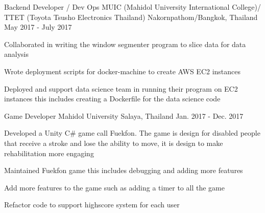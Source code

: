 \begin{cventries}
    \cventry
      {Backend Developer / Dev Ops} %
      {MUIC (Mahidol University International College)/ TTET (Toyota Tsusho Electronics Thailand)} %
      {Nakornpathom/Bangkok, Thailand} %
      {May 2017 - July 2017} %
      {
        \begin{cvitems} %
          \item {Collaborated in writing the window segmenter program to slice data for data analysis}
          \item {Wrote deployment scripts for docker-machine to create AWS EC2 instances}
          \item {Deployed and support data science team in running their program on EC2 instances this includes creating a Dockerfile for the data science code}
        \end{cvitems}
      }

  \cventry
    {Game Developer} %
    {Mahidol University} %
    {Salaya, Thailand} %
    {Jan. 2017 - Dec. 2017} %
    {
      \begin{cvitems} %
        \item {Developed a Unity C\# game call Fuekfon. The game is design for disabled people that receive a stroke and lose the ability to move, it is design to make rehabilitation more engaging}
        \item {Maintained Fuekfon game this includes debugging and adding more features}
        \item {Add more features to the game such as adding a timer to all the game}
        \item {Refactor code to support highscore system for each user}
      \end{cvitems}
    }
  

\end{cventries}
